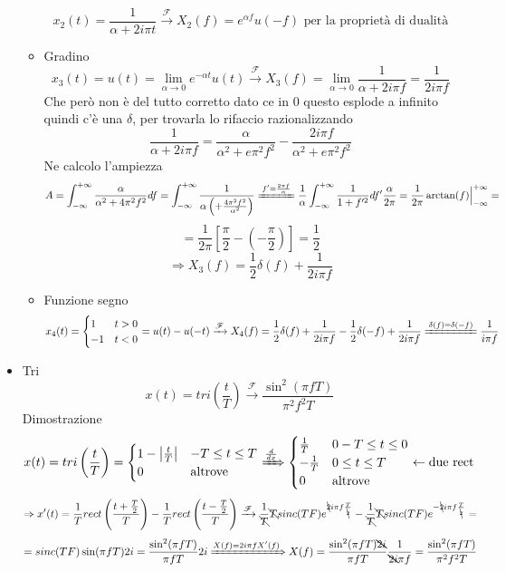 \documentclass{article}
\newcommand{\trasformata}{\xrightarrow{\mathscr{F}}}
\begin{document}
\begin{itemize}
\begin{itemize}
                \[x_2(t)=\frac{1}{\alpha+2i\pi t}\trasformata X_2(f)=e^{\alpha f}u(-f)\text{ per la proprietà di dualità}\]
            \item Gradino
                \[x_3(t)=u(t)=\lim_{\alpha\to0}e^{-\alpha t}u(t)\trasformata X_3(f)=\lim_{\alpha\to0}\frac{1}{\alpha+2i\pi f}=\frac{1}{2i\pi f}\]
                Che però non è del tutto corretto dato ce in 0 questo esplode a infinito quindi c'è una $\delta$, per trovarla lo rifaccio razionalizzando
                \[\frac{1}{\alpha+2i\pi f}=\frac{\alpha}{\alpha^2+e\pi^2 f^2}-\frac{2i\pi f}{\alpha^2+e\pi^2 f^2}\]
                Ne calcolo l'ampiezza
                \[A=\int_{-\infty}^{+\infty}\frac{\alpha}{\alpha^2+4\pi^2 f^2}df=\int_{-\infty}^{+\infty}\frac{1}{\alpha\left(+\frac{4\pi^2 f^2}{\alpha^2}\right)}\xlongequal{f'=\frac{2\pi f}{\alpha}}\frac{1}{\alpha}\int_{-\infty}^{+\infty}\frac{1}{1+f'^2}df'\frac{\alpha}{2\pi}=\frac{1}{2\pi}\arctan(f)\Big|_{-\infty}^{+\infty}=\]
                \[=\frac{1}{2\pi}\left[\frac{\pi}{2}-\left(-\frac{\pi}{2}\right)\right]=\frac{1}{2}\]
                \[\Rightarrow X_3(f)=\frac{1}{2}\delta(f)+\frac{1}{2i\pi f}\]
            \item Funzione segno
                \[x_4(t)=\begin{cases}
                    1&t>0\\
                    -1&t<0
                \end{cases}=u(t)-u(-t)\trasformata X_4(f)=\frac{1}{2}\delta(f)+\frac{1}{2i\pi f}-\frac{1}{2}\delta(-f)+\frac{1}{2i\pi f}\xlongequal{\delta(f)=\delta(-f)}\frac{1}{i\pi f}\]
        \end{itemize}
    \item Tri
        \[x(t)=tri\left(\frac{t}{T}\right)\trasformata\frac{\sin^2(\pi fT)}{\pi^2 f^2 T}\]
        Dimostrazione
        \[x(t)=tri\left(\frac{t}{T}\right)=\begin{cases}
            1-\left|\frac{t}{T}\right|&-T\leq t\leq T\\
            0&\text{altrove}
        \end{cases}\xRightarrow{\frac{d}{dx}}\begin{cases}
            \frac{1}{T}&0-T\leq t\leq 0\\
            -\frac{1}{T}&0\leq t\leq T\\
            0&\text{altrove}
        \end{cases}\leftarrow\text{due rect}\]
        \[\Rightarrow x'(t)=\frac{1}{T}rect\left(\frac{t+\frac{T}{2}}{T}\right)-\frac{1}{T}rect\left(\frac{t-\frac{T}{2}}{T}\right)\trasformata \frac{1}{\bcancel{T}}\bcancel{T}sinc(TF)e^{\bcancel{2}i\pi f\frac{T}{\bcancel{2}}}-\frac{1}{\bcancel{T}}\bcancel{T}sinc(TF)e^{-\bcancel{2}i\pi f\frac{T}{\bcancel{2}}}=\]
        \[=sinc(TF)\sin(\pi fT)2i=\frac{\sin^2(\pi fT)}{\pi fT}2i\xRightarrow{X(f)=2i\pi fX'(f)} X(f)=\frac{\sin^2(\pi fT)\bcancel{2i}}{\pi fT}\frac{1}{\bcancel{2i}\pi f}=\frac{\sin^2(\pi fT)}{\pi^2 f^2 T}\]
\end{itemize}
\end{document}
